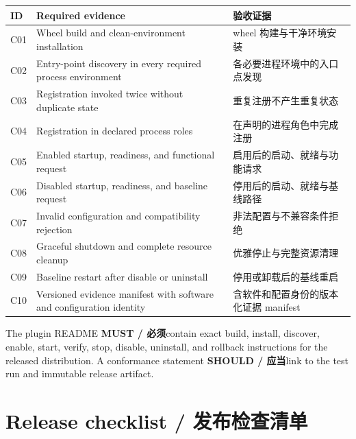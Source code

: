 \documentclass[11pt,a4paper,fontset=none]{ctexart}
\newcommand{\must}{\textbf{MUST / 必须}}
\newcommand{\should}{\textbf{SHOULD / 应当}}
\begin{document}
\begin{longtable}{>{\raggedright\arraybackslash}p{}>{\raggedright\arraybackslash}p{}>{\raggedright\arraybackslash}p{}}
\toprule
\textbf{ID} & \textbf{Required evidence} & \textbf{验收证据} \\
\midrule
\endhead
C01 & Wheel build and clean-environment installation & wheel 构建与干净环境安装 \\
C02 & Entry-point discovery in every required process environment & 各必要进程环境中的入口点发现 \\
C03 & Registration invoked twice without duplicate state & 重复注册不产生重复状态 \\
C04 & Registration in declared process roles & 在声明的进程角色中完成注册 \\
C05 & Enabled startup, readiness, and functional request & 启用后的启动、就绪与功能请求 \\
C06 & Disabled startup, readiness, and baseline request & 停用后的启动、就绪与基线路径 \\
C07 & Invalid configuration and compatibility rejection & 非法配置与不兼容条件拒绝 \\
C08 & Graceful shutdown and complete resource cleanup & 优雅停止与完整资源清理 \\
C09 & Baseline restart after disable or uninstall & 停用或卸载后的基线重启 \\
C10 & Versioned evidence manifest with software and configuration identity & 含软件和配置身份的版本化证据 manifest \\
\bottomrule
\end{longtable}

The plugin README \must contain exact build, install, discover, enable, start, verify, stop, disable,
uninstall, and rollback instructions for the released distribution. A conformance statement
\should link to the test run and immutable release artifact.

\section{Release checklist / 发布检查清单}
\end{document}
